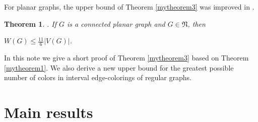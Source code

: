 \documentclass[fleqn,12pt,twoside]{article}
\newtheorem{theorem}{Theorem}
\begin{document}
For planar graphs, the upper bound of Theorem \ref{mytheorem3} was
improved in \cite{b4}.

\begin{theorem}
\label{mytheorem6}\cite{b4}. If $G$ is a connected planar graph and
$G\in \mathfrak{N}$, then
\begin{center}
$W(G)\leq \frac{11}{6}\vert V(G)\vert$.
\end{center}
\end{theorem}

In this note we give a short proof of Theorem \ref{mytheorem3} based
on Theorem \ref{mytheorem1}. We also derive a new upper bound for
the greatest possible number of colors in interval edge-colorings of
regular graphs.

\bigskip

\section{Main results}\
\end{document}
